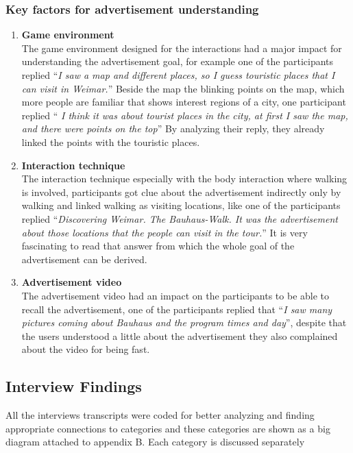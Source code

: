 \subsubsection{Key factors for advertisement understanding}
\begin{enumerate}
\item	\textbf{Game environment} \\
The game environment designed for the interactions had a major impact for understanding the advertisement goal, for example one of the participants replied ``\emph{I saw a map and different places, so I guess touristic places that I can visit in Weimar.}'' Beside the map the blinking points on the map, which more people are familiar that shows interest regions of a city, one participant replied ``\emph{ I think it was about tourist places in the city, at first I saw the map, and there were points on the top}'' By analyzing their reply, they already linked the points with the touristic places.

\item	\textbf{Interaction technique} \\
The interaction technique especially with the body interaction where walking is involved, participants got clue about the advertisement indirectly only by walking and linked walking as visiting locations, like one of the participants replied ``\emph{Discovering Weimar. The Bauhaus-Walk. It was the advertisement about those locations that the people can visit in the tour.}'' It is very fascinating to read that answer from which the whole goal of the advertisement can be derived.

\item	\textbf{Advertisement video} \\
The advertisement video had an impact on the participants to be able to recall the advertisement, one of the participants replied that ``\emph{I saw many pictures coming about Bauhaus and the program times and day}'', despite that the users understood a little about the advertisement they also complained about the video for being fast.

\end{enumerate}


\subsection{Interview Findings}
All the interviews transcripts were coded for better analyzing and finding appropriate connections to categories and these categories are shown as a big diagram attached to appendix B. Each category is discussed separately 


